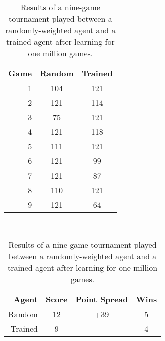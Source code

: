 
\begin{table}
\center
\begin{tabular}{|r|c|c|}
	\hline
	\textbf{Game} & \textbf{Random} & \textbf{Trained}\\\hline

	1 & 104 & 121 \\\hline
	2 & 121 & 114 \\\hline
	3 &  75 & 121 \\\hline
	4 & 121 & 118 \\\hline
	5 & 111 & 121 \\\hline
	6 & 121 &  99 \\\hline
	7 & 121 &  87 \\\hline
	8 & 110 & 121 \\\hline
	9 & 121 &  64 \\\hline

\end{tabular}
~
\begin{tabular}{|r|c|c|c|}
	\hline
	\textbf{Agent} & \textbf{Score} & \textbf{Point Spread} & \textbf{Wins}
	\\\hline
	Random & 12 & +39 & 5
	\\\hline
	Trained  & 9 & \textemdash & 4
	\\\hline
\end{tabular}

\caption{
	Results of a nine-game tournament played between
	a randomly-weighted agent
	and
	a trained agent after learning for one million games.
}

\label{tab_r1-randtourny}

\end{table}
